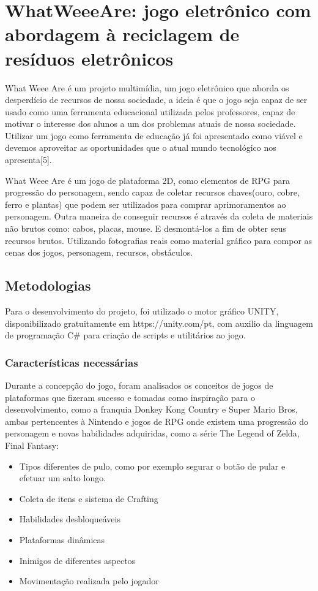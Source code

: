 \chapter{WhatWeeeAre: jogo eletrônico com abordagem à reciclagem de resíduos eletrônicos}

What Weee Are é um projeto multimídia, um jogo eletrônico que aborda os desperdício de recursos de nossa sociedade, a ideia é que o jogo seja capaz de ser usado como uma ferramenta educacional utilizada pelos professores, capaz de motivar o interesse dos alunos a um dos problemas atuais de nossa sociedade. Utilizar um jogo como ferramenta de educação já foi apresentado como viável e devemos aproveitar as oportunidades que o atual mundo tecnológico nos apresenta[5]. 

What Weee Are é um jogo de plataforma 2D, como elementos de RPG para progressão do personagem, sendo capaz de coletar recursos chaves(ouro, cobre, ferro e plantas) que podem ser utilizados para comprar aprimoramentos ao personagem. Outra maneira de conseguir recursos é através da coleta de materiais não brutos como: cabos, placas, mouse. E desmontá-los a fim de obter seus recursos brutos. Utilizando fotografias reais como material gráfico para compor as cenas dos jogos, personagem, recursos, obstáculos.

\section{Metodologias}

Para o desenvolvimento do projeto, foi utilizado o motor gráfico UNITY, disponibilizado gratuitamente em https://unity.com/pt, com auxilio da linguagem de programação C\# para criação de scripts e utilitários ao jogo.

\subsection{Características necessárias}
Durante a concepção do jogo, foram analisados os conceitos de jogos de plataformas que fizeram sucesso e tomadas como inspiração para o desenvolvimento, como a franquia Donkey Kong Country e Super Mario Bros, ambas pertencentes à Nintendo e jogos de RPG onde existem uma progressão do personagem e novas habilidades adquiridas, como a série The Legend of Zelda, Final Fantasy:

\begin{itemize}
    \item Tipos diferentes de pulo, como por exemplo segurar o botão de pular e efetuar um salto longo.
    \item Coleta de itens e sistema de Crafting
    \item Habilidades desbloqueáveis
    \item Plataformas dinâmicas
    \item Inimigos de diferentes aspectos
    \item Movimentação realizada pelo jogador
\end{itemize}

